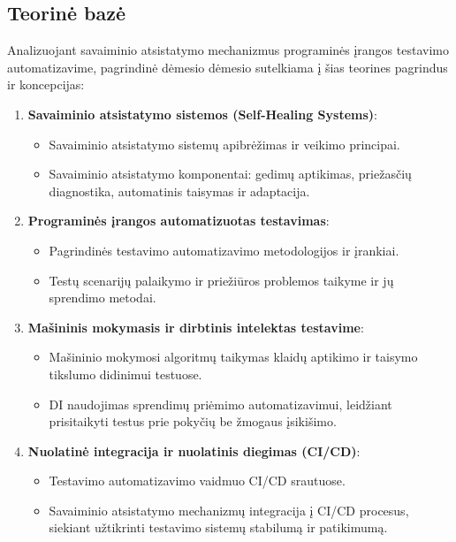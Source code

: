\documentclass[
]{VUMIFPSkursinis}
\begin{document}
\subsection{Teorinė bazė}

Analizuojant savaiminio atsistatymo mechanizmus programinės įrangos testavimo automatizavime, pagrindinė dėmesio dėmesio sutelkiama į šias teorines pagrindus ir koncepcijas:

\begin{enumerate}
    \item \textbf{Savaiminio atsistatymo sistemos (Self-Healing Systems)}:
    \begin{itemize}
        \item Savaiminio atsistatymo sistemų apibrėžimas ir veikimo principai.
        \item Savaiminio atsistatymo komponentai: gedimų aptikimas, priežasčių diagnostika, automatinis taisymas ir adaptacija.
    \end{itemize}
    
    \item \textbf{Programinės įrangos automatizuotas testavimas}:
    \begin{itemize}
        \item Pagrindinės testavimo automatizavimo metodologijos ir įrankiai.
        \item Testų scenarijų palaikymo ir priežiūros problemos taikyme ir jų sprendimo metodai.
    \end{itemize}
    
    \item \textbf{Mašininis mokymasis ir dirbtinis intelektas testavime}:
    \begin{itemize}
        \item Mašininio mokymosi algoritmų taikymas klaidų aptikimo ir taisymo tikslumo didinimui testuose.
        \item DI naudojimas sprendimų priėmimo automatizavimui, leidžiant prisitaikyti testus prie pokyčių be žmogaus įsikišimo.
    \end{itemize}
    
    \item \textbf{Nuolatinė integracija ir nuolatinis diegimas (CI/CD)}:
    \begin{itemize}
        \item Testavimo automatizavimo vaidmuo CI/CD srautuose.
        \item Savaiminio atsistatymo mechanizmų integracija į CI/CD procesus, siekiant užtikrinti testavimo sistemų stabilumą ir patikimumą.
    \end{itemize}
    

\end{enumerate}
\end{document}
